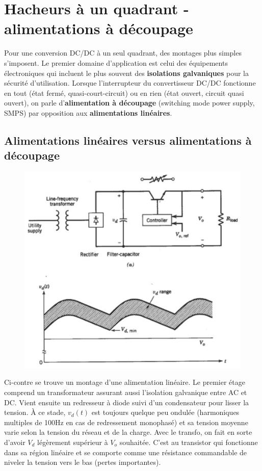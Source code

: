 
\chapter{Hacheurs à un quadrant - alimentations à découpage}	
	Pour une conversion DC/DC à un seul quadrant, des montages plus simples s'imposent. Le premier domaine d'application est celui des équipements électroniques qui incluent le plus souvent des \textbf{isolations galvaniques} pour la sécurité d'utilisation. Lorsque l'interrupteur du convertisseur DC/DC fonctionne en tout (état fermé, quasi-court-circuit) ou en rien (état ouvert, circuit quasi ouvert), on parle d'\textbf{alimentation à découpage} (switching mode power supply, SMPS) par opposition aux \textbf{alimentations linéaires}. 
	
	\section{Alimentations linéaires versus alimentations à découpage}
		\begin{figure}
		\vspace{-5mm}
		\includegraphics[scale=0.3]{ch5/1}
		\end{figure}
		Ci-contre se trouve un montage d'une alimentation linéaire. Le premier étage comprend un transformateur assurant aussi l'isolation galvanique entre AC et DC. Vient ensuite un redresseur à diode suivi d'un condensateur pour lisser la tension. À ce stade, $v_d(t)$ est toujours quelque peu ondulée (harmoniques multiples de 100Hz en cas de redressement monophasé) et sa tension moyenne varie selon la tension du réseau et de la charge. Avec le transfo, on fait en sorte d'avoir $V_d$ légèrement supérieur à $V_o$ souhaitée. C'est au transistor qui fonctionne dans sa région linéaire et se comporte comme une résistance commandable de niveler la tension vers le bas (pertes importantes). \\
		

